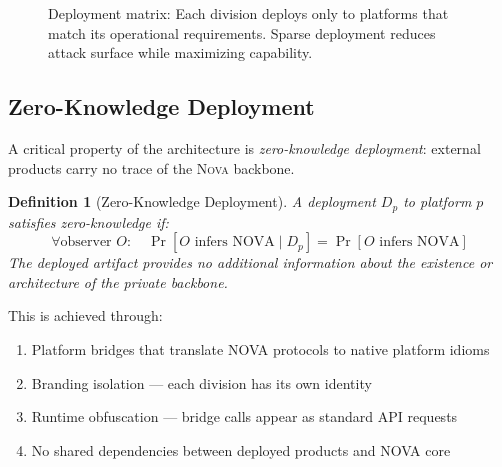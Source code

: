 \documentclass[12pt]{article}
\newtheorem{definition}[theorem]{Definition}
\newcommand{\NOVA}{\textsc{Nova}}
\begin{document}
\begin{figure}[htbp]
\caption{Deployment matrix: Each division deploys only to platforms that match its operational requirements. Sparse deployment reduces attack surface while maximizing capability.}
\label{fig:matrix}
\end{figure}

\subsection{Zero-Knowledge Deployment}

A critical property of the architecture is \emph{zero-knowledge deployment}: external products carry no trace of the \NOVA{} backbone.

\begin{definition}[Zero-Knowledge Deployment]
A deployment $D_p$ to platform $p$ satisfies zero-knowledge if:
\[
\forall \text{observer } O: \quad \Pr[O \text{ infers NOVA} \mid D_p] = \Pr[O \text{ infers NOVA}]
\]
The deployed artifact provides no additional information about the existence or architecture of the private backbone.
\end{definition}

This is achieved through:
\begin{enumerate}
    \item Platform bridges that translate NOVA protocols to native platform idioms
    \item Branding isolation — each division has its own identity
    \item Runtime obfuscation — bridge calls appear as standard API requests
    \item No shared dependencies between deployed products and NOVA core
\end{enumerate}
\end{document}
